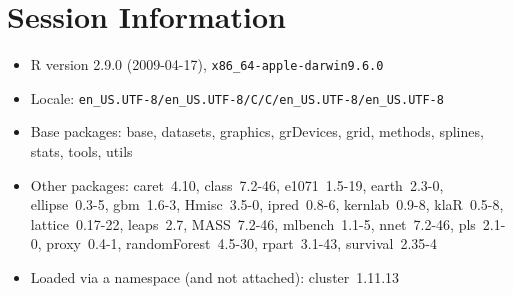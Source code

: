 \documentclass[12pt]{article}
\begin{document}
\section{Session Information}

\begin{itemize}
  \item R version 2.9.0 (2009-04-17), \verb|x86_64-apple-darwin9.6.0|
  \item Locale: \verb|en_US.UTF-8/en_US.UTF-8/C/C/en_US.UTF-8/en_US.UTF-8|
  \item Base packages: base, datasets, graphics, grDevices, grid,
    methods, splines, stats, tools, utils
  \item Other packages: caret~4.10, class~7.2-46, e1071~1.5-19,
    earth~2.3-0, ellipse~0.3-5, gbm~1.6-3, Hmisc~3.5-0, ipred~0.8-6,
    kernlab~0.9-8, klaR~0.5-8, lattice~0.17-22, leaps~2.7, MASS~7.2-46,
    mlbench~1.1-5, nnet~7.2-46, pls~2.1-0, proxy~0.4-1,
    randomForest~4.5-30, rpart~3.1-43, survival~2.35-4
  \item Loaded via a namespace (and not attached): cluster~1.11.13
\end{itemize}
\end{document}
